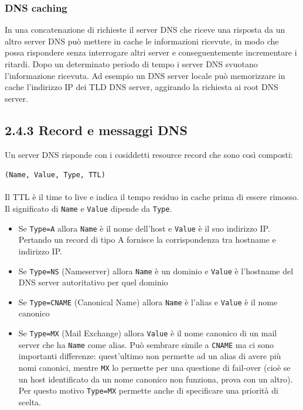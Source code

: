 \documentclass{book}
\begin{document}
\subsubsection*{DNS caching}
In una concatenazione di richieste il server DNS che riceve una risposta da un altro server DNS può mettere in cache le informazioni ricevute, in modo che possa rispondere senza interrogare altri server e conseguentemente incrementare i ritardi. Dopo un determinato periodo di tempo i server DNS svuotano l'informazione ricevuta. Ad esempio un DNS server locale può memorizzare in cache l'indirizzo IP dei TLD DNS server, aggirando la richiesta ai root DNS server.

\subsection*{2.4.3 Record e messaggi DNS}
Un server DNS risponde con i cosiddetti resource record che sono così composti:

\texttt{(Name, Value, Type, TTL)}
\\\\
Il TTL è il time to live e indica il tempo residuo in cache prima di essere rimosso. Il significato di \texttt{Name} e \texttt{Value} dipende da \texttt{Type}.
\begin{itemize}
	\item Se \texttt{Type=A} allora \texttt{Name} è il nome dell'host e \texttt{Value} è il suo indirizzo IP. Pertando un record di tipo A fornisce la corrispondenza tra hostname e indirizzo IP. 
	
	\item Se \texttt{Type=NS} (Nameserver) allora \texttt{Name} è un dominio e \texttt{Value} è l'hostname del DNS server autoritativo per quel dominio
	
	\item Se \texttt{Type=CNAME} (Canonical Name) allora \texttt{Name} è l'alias e \texttt{Value} è il nome canonico
	
	\item Se \texttt{Type=MX} (Mail Exchange) allora \texttt{Value} è il nome canonico di un mail server che ha \texttt{Name} come alias. Può sembrare simile a \texttt{CNAME} ma ci sono importanti differenze: quest'ultimo non permette ad un alias di avere più nomi canonici, mentre \texttt{MX} lo permette per una questione di fail-over (cioè se un host identificato da un nome canonico non funziona, prova con un altro). Per questo motivo \texttt{Type=MX} permette anche di specificare una priorità di scelta.
\end{itemize}
\end{document}
